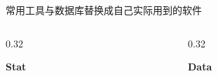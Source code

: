 \documentclass[aspectratio=169]{ctexbeamer}
\begin{document}
\begin{frame}[shrink=6]{常用工具与数据库}{替换成自己实际用到的软件}
\begin{columns}[t]
\begin{column}{0.32\textwidth}
      \begin{card}
        \centering
        {\color{cyanL}\bfseries Stat}\\[1mm]
        \\[0.8mm]
      \end{card}
    \end{column}
    \begin{column}{0.32\textwidth}
      \begin{card}
        \centering
        {\color{greenL}\bfseries Data}\\[1mm]
        \\[0.8mm]
      \end{card}
    \end{column}
  \end{columns}

\end{frame}
\end{document}
